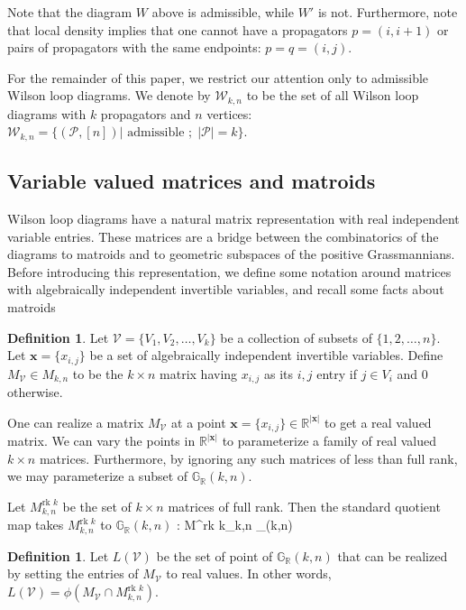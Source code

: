 \documentclass[11pt]{article}
\newcommand{\R}{\mathbb{R}}
\newcommand{\Grall}{\mathbb{G}_{\R}}
\newcommand{\rk}{\textrm{rk }}
\def\ba #1\ea{\begin{align} #1 \end{align}}
\newcommand{\cP}{\mathcal{P}}
\newcommand{\cV}{\mathcal{V}}
\newcommand{\cW}{\mathcal{W}}
\theoremstyle{remark}
\theoremstyle{definition}
\newtheorem{dfn}[thm]{Definition}
\begin{document}
Note that the diagram $W$ above is admissible, while $W'$ is not. Furthermore, note that local density implies that one cannot have a propagators $p = (i, i+1)$ or pairs of propagators with the same endpoints: $p = q = (i, j)$.

For the remainder of this paper, we restrict our attention only to admissible Wilson loop diagrams. We denote by $\cW_{k,n}$ to be the set of all Wilson loop diagrams with $k$ propagators and $n$ vertices: $\cW_{k,n} = \{ (\cP,[n])| \textrm{ admissible }; \; |\cP| = k\}$. 


\subsection{Variable valued matrices and matroids \label{sec:matrices and matroids}}

Wilson loop diagrams have a natural matrix representation with real independent variable entries. These matrices are a bridge between the combinatorics of the diagrams to matroids and to geometric subspaces of the positive Grassmannians. Before introducing this representation, we  define some notation around matrices with algebraically independent invertible variables, and recall some facts about matroids

\begin{dfn} \label{dfn:variablevaluedmatrix}
Let $\cV = \{V_1, V_2, \dots, V_k\}$ be a collection of subsets of $\{1,2,\dots,n\}$. Let $\mathbf{x}=\{x_{i,j}\}$ be a set of algebraically independent invertible variables. Define $M_{\mathcal{V}}\in M_{k,n}$ to be the $k \times n$ matrix having $x_{i,j}$ as its $i,j$ entry if $j \in V_i$ and $0$ otherwise.
\end{dfn}

One can realize a matrix $M_\cV$ at a point $\mathbf{x}=\{x_{i,j}\} \in \R^{|\mathbf{x}|}$ to get a real valued matrix. We can vary the points in $\R^{|\mathbf{x}|}$ to parameterize a family of real valued $k \times n$ matrices. Furthermore, by ignoring any such matrices of less than full rank, we may parameterize a subset of $\Grall(k,n)$.

Let $M^{\rk k}_{k,n}$ be the set of $k \times n$ matrices of full rank. Then the standard quotient map takes $M^{\rk k}_{k,n}$ to $\Grall(k,n)$ \ba \phi: M^{\rk k}_{k,n} \rightarrow \Grall(k,n)  \label{eq:maps}\ea

\begin{dfn} \label{dfn:loci}
Let $L(\cV)$ be the set of point of $\Grall(k,n)$ that can be realized by setting the entries of $M_\cV$ to real values. In other words, $L(\cV) = \phi (M_{\cV} \cap M^{\rk k}_{k,n})$.  
\end{dfn}
\end{document}
